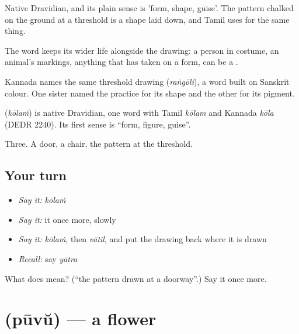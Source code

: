 Native Dravidian, and its plain sense is 'form, shape, guise'. The pattern chalked on the ground at a threshold is a shape laid down, and Tamil uses  for the same thing.

The word keeps its wider life alongside the drawing: a person in costume, an animal's markings, anything that has taken on a form, can be a .

Kannada names the same threshold drawing  (\emph{raṅgōli}), a word built on Sanskrit colour. One sister named the practice for its shape and the other for its pigment.

\begin{cousinweb}
\textbf{} (\emph{kōlaṁ}) is native Dravidian, one word with Tamil \emph{kōlam} and Kannada \emph{kōla} (DEDR 2240). Its first sense is \textquotedblleft{}form, figure, guise\textquotedblright{}.
\end{cousinweb}

\begin{grammarlens}[title={What you've built}]
Three. A door, a chair, the pattern at the threshold.
\end{grammarlens}

\subsection*{Your turn}
\begin{itemize}
\raggedright
  \item \emph{Say it:} \emph{kōlaṁ}
  \item \emph{Say it:} it once more, slowly
  \item \emph{Say it:} \emph{kōlaṁ}, then \emph{vātil}, and put the drawing back where it is drawn
  \item \emph{Recall:} say \emph{yātra}
\end{itemize}

\begin{tcolorbox}[breakable,colback=teal!4,colframe=teal!35!black,title={Before you move on}]
What does  mean? (\textquotedblleft{}the pattern drawn at a doorway\textquotedblright{}.) Say it once more.
\end{tcolorbox}
\section[\texorpdfstring{\ml{പൂവ്} (pūvŭ)}{പൂവ് (pūvŭ)}]{ (pūvŭ) — a flower}

\label{lesson:ML-C52-flower}



